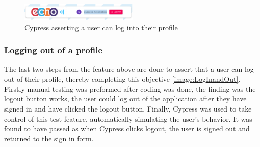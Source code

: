 \begin{figure}[h!]
    \centering
    \includegraphics[width=0.5\textwidth]{images/CyLogIn.png}
    \caption{Cypress asserting a user can log into their profile}
    \label{image:CyLogIn}
\end{figure}

\subsubsection{Logging out of a profile}
The last two steps from the feature above are done to assert that a user can log out of their profile, thereby completing this objective \ref{image:LogInandOut}. Firstly manual testing was preformed after coding was done, the finding was the logout button works, the user could log out of the application after they have signed in and have clicked the logout button. Finally, Cypress was used to take control of this test feature, automatically simulating the user's behavior. It was found to have passed as when Cypress clicks logout, the user is signed out and returned to the sign in form.

